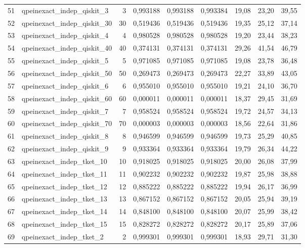 \documentclass[a4paper,10pt]{article}
\begin{document}
\begin{landscape}
\begin{longtable}{r l r rrr rrr}
51 & qpeinexact\_indep\_qiskit\_3 & 3 & 0,993188 & 0,993188 & 0,993384 & 19,08 & 23,20 & 39,55\\
52 & qpeinexact\_indep\_qiskit\_30 & 30 & 0,519436 & 0,519436 & 0,519436 & 19,35 & 25,12 & 37,14\\
53 & qpeinexact\_indep\_qiskit\_4 & 4 & 0,980528 & 0,980528 & 0,980528 & 19,20 & 23,44 & 38,23\\
54 & qpeinexact\_indep\_qiskit\_40 & 40 & 0,374131 & 0,374131 & 0,374131 & 29,26 & 41,54 & 46,79\\
55 & qpeinexact\_indep\_qiskit\_5 & 5 & 0,971085 & 0,971085 & 0,971085 & 19,08 & 23,78 & 36,48\\
56 & qpeinexact\_indep\_qiskit\_50 & 50 & 0,269473 & 0,269473 & 0,269473 & 22,27 & 33,89 & 43,05\\
57 & qpeinexact\_indep\_qiskit\_6 & 6 & 0,955010 & 0,955010 & 0,955010 & 19,21 & 24,10 & 36,70\\
58 & qpeinexact\_indep\_qiskit\_60 & 60 & 0,000011 & 0,000011 & 0,000011 & 18,37 & 29,45 & 31,69\\
59 & qpeinexact\_indep\_qiskit\_7 & 7 & 0,958524 & 0,958524 & 0,958524 & 19,72 & 24,57 & 34,13\\
60 & qpeinexact\_indep\_qiskit\_70 & 70 & 0,000003 & 0,000003 & 0,000003 & 18,56 & 22,64 & 31,86\\
61 & qpeinexact\_indep\_qiskit\_8 & 8 & 0,946599 & 0,946599 & 0,946599 & 19,73 & 25,29 & 40,85\\
62 & qpeinexact\_indep\_qiskit\_9 & 9 & 0,933364 & 0,933364 & 0,933364 & 19,79 & 26,34 & 44,22\\
63 & qpeinexact\_indep\_tket\_10 & 10 & 0,918025 & 0,918025 & 0,918025 & 20,00 & 26,08 & 37,99\\
64 & qpeinexact\_indep\_tket\_11 & 11 & 0,902232 & 0,902232 & 0,902232 & 19,87 & 25,98 & 38,88\\
65 & qpeinexact\_indep\_tket\_12 & 12 & 0,885222 & 0,885222 & 0,885222 & 19,94 & 26,17 & 36,99\\
66 & qpeinexact\_indep\_tket\_13 & 13 & 0,867152 & 0,867152 & 0,867152 & 20,05 & 25,94 & 39,19\\
67 & qpeinexact\_indep\_tket\_14 & 14 & 0,848100 & 0,848100 & 0,848100 & 20,07 & 25,99 & 38,42\\
68 & qpeinexact\_indep\_tket\_15 & 15 & 0,828272 & 0,828272 & 0,828272 & 20,17 & 25,89 & 37,06\\
69 & qpeinexact\_indep\_tket\_2 & 2 & 0,999301 & 0,999301 & 0,999301 & 18,93 & 29,71 & 31,30\\

\end{longtable}
\end{landscape}
\end{document}
